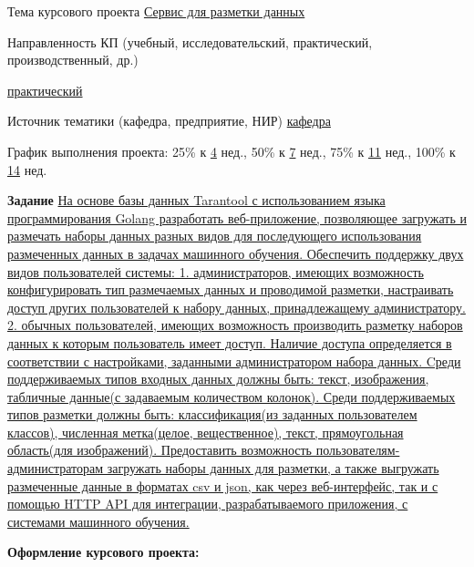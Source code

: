 \begin{titlepage}
\begin{center}
    Тема курсового проекта
    \uline{\hfill Сервис для разметки данных \hfill}


    {\flushleft
    Направленность КП (учебный, исследовательский, практический,
    производственный, др.) 
    \hfill}

    \uline{\hfill
        практический
    \hfill}

    Источник тематики (кафедра, предприятие, НИР)
    \uline{\hfill
        кафедра
    \hfill}

    График выполнения проекта: 
        25\% к \uline{\hfill4\hfill} нед.,
        50\% к \uline{\hfill7\hfill} нед.,
        75\% к \uline{\hfill11\hfill} нед.,
        100\% к \uline{\hfill14\hfill} нед.

    \textbf{Задание}
    \uline{На основе базы данных Tarantool с использованием языка программирования Golang разработать веб-приложение, 
    позволяющее загружать и размечать наборы данных разных видов для последующего использования размеченных данных
    в задачах машинного обучения.        
    Обеспечить поддержку двух видов пользователей системы:
    1. администраторов, имеющих возможность конфигурировать тип размечаемых данных и проводимой разметки, настраивать 
    доступ других пользователей к набору данных, принадлежащему администратору.  
    2. обычных пользователей, имеющих возможность производить разметку наборов данных к которым пользователь имеет доступ. 
    Наличие доступа определяется в соответствии с настройками, заданными администратором набора данных.
    Cреди поддерживаемых типов входных данных должны быть: текст, изображения, табличные данные(с задаваемым 
    количеством колонок).
    Среди поддерживаемых типов разметки должны быть: классификация(из заданных пользователем классов), 
    численная метка(целое, вещественное), текст, прямоугольная область(для изображений).
    Предоставить возможность пользователям-администраторам загружать наборы данных для разметки, а также 
    выгружать размеченные данные в форматах csv и json, как через веб-интерфейс, так и с помощью HTTP API для интеграции, 
    разрабатываемого приложения, с системами машинного обучения. 
    }

    {\flushleft
    \textbf{Оформление курсового проекта:}
    \hfill}


\end{center}
\end{titlepage}
